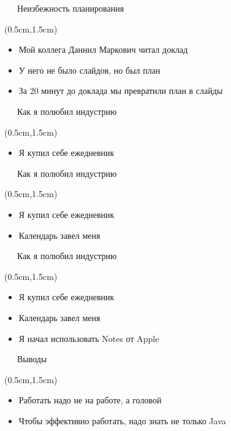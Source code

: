 \documentclass[xetex,18pt,aspectratio=43]{beamer}
\begin{document}
\begin{Large}
\begin{frame}{\ \ \ Неизбежность планирования}
\begin{textblock*}{\framewidth-0.8cm}(0.5cm,1.5cm)
\begin{itemize}
  \item Мой коллега Даннил Маркович читал доклад
  \item У него не было слайдов, но был план
  \item За 20 минут до доклада мы превратили план в слайды
\end{itemize}
\end{textblock*}
\end{frame}

\begin{frame}{\ \ \ Как я полюбил индустрию}
\begin{textblock*}{\framewidth-0.8cm}(0.5cm,1.5cm)
\begin{itemize}
  \item Я купил себе ежедневник
\end{itemize}
\end{textblock*}
\end{frame}

\begin{frame}{\ \ \ Как я полюбил индустрию}
\begin{textblock*}{\framewidth-0.8cm}(0.5cm,1.5cm)
\begin{itemize}
  \item Я купил себе ежедневник
  \item Календарь завел меня
\end{itemize}
\end{textblock*}
\end{frame}

\begin{frame}{\ \ \ Как я полюбил индустрию}
\begin{textblock*}{\framewidth-0.8cm}(0.5cm,1.5cm)
\begin{itemize}
  \item Я купил себе ежедневник
  \item Календарь завел меня
  \item Я начал использовать Notes от Apple
\end{itemize}
\end{textblock*}
\end{frame}

\begin{frame}{\ \ \ Выводы}
\begin{textblock*}{\framewidth-0.8cm}(0.5cm,1.5cm)
\begin{itemize}
  \item Работать надо не на работе, а головой
  \item Чтобы эффективно работать, надо знать не только Java
\end{itemize}
\end{textblock*}
\end{frame}


\end{Large}
\end{document}
